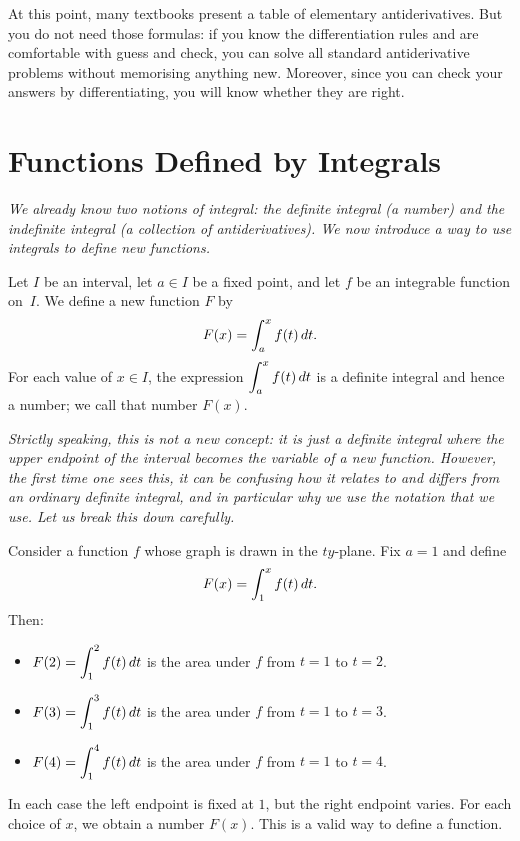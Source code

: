 \begin{remark}
At this point, many textbooks present a table of elementary antiderivatives.  But you do not need those formulas: if you know the differentiation rules and are comfortable with guess and check, you can solve all standard antiderivative problems without memorising anything new.  Moreover, since you can check your answers by differentiating, you will know whether they are right.
\end{remark}

\section{Functions Defined by Integrals}
\label{sec:8.2}

\textit{We already know two notions of integral: the definite integral (a number) and the indefinite integral (a collection of antiderivatives).  We now introduce a way to use integrals to define new functions.}

\begin{definition}
\label{def:8-3}
Let $I$ be an interval, let $a \in I$ be a fixed point, and let $f$ be an integrable function on~$I$.  We define a new function $F$ by
\[
  F(x) = \int_{a}^{x} f(t)\,dt.
\]
For each value of $x \in I$, the expression $\displaystyle\int_{a}^{x} f(t)\,dt$ is a definite integral and hence a number; we call that number $F(x)$.
\end{definition}

\textit{Strictly speaking, this is not a new concept: it is just a definite integral where the upper endpoint of the interval becomes the variable of a new function.  However, the first time one sees this, it can be confusing how it relates to and differs from an ordinary definite integral, and in particular why we use the notation that we use.  Let us break this down carefully.}

\begin{example}
\label{ex:8-3}
Consider a function $f$ whose graph is drawn in the $ty$-plane.  Fix $a = 1$ and define
\[
  F(x) = \int_{1}^{x} f(t)\,dt.
\]
Then:
\begin{itemize}
  \item $F(2) = \displaystyle\int_{1}^{2} f(t)\,dt$ is the area under $f$ from $t=1$ to $t=2$.
  \item $F(3) = \displaystyle\int_{1}^{3} f(t)\,dt$ is the area under $f$ from $t=1$ to $t=3$.
  \item $F(4) = \displaystyle\int_{1}^{4} f(t)\,dt$ is the area under $f$ from $t=1$ to $t=4$.
\end{itemize}
In each case the left endpoint is fixed at $1$, but the right endpoint varies.  For each choice of $x$, we obtain a number $F(x)$.  This is a valid way to define a function.
\end{example}

